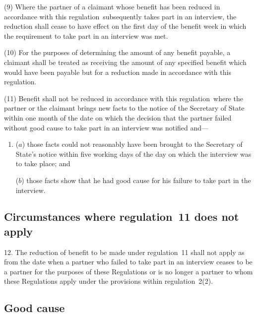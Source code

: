 \documentclass[12pt,a4paper]{article}
\begin{document}
(9) Where the partner of a claimant whose benefit has been reduced in accordance with this regulation~subsequently takes part in an interview, the reduction shall cease to have effect on the first day of the benefit week in which the requirement to take part in an interview was met.

(10) For the purposes of determining the amount of any benefit payable, a claimant shall be treated as receiving the amount of any specified benefit which would have been payable but for a reduction made in accordance with this regulation.

(11) Benefit shall not be reduced in accordance with this regulation~where the partner or the claimant brings new facts to the notice of the Secretary of State within one month of the date on which the decision that the partner failed without good cause to take part in an interview was notified and—
\begin{enumerate}\item[]
($a$) those facts could not reasonably have been brought to the Secretary of State’s notice within five working days of the day on which the interview was to take place; and

($b$) those facts show that he had good cause for his failure to take part in the interview.
\end{enumerate}

\subsection[12. Circumstances where regulation~11 does not apply]{Circumstances where regulation~11 does not apply}

12.  The reduction of benefit to be made under regulation~11 shall not apply as from the date when a partner who failed to take part in an interview ceases to be a partner for the purposes of these Regulations or is no longer a partner to whom these Regulations apply under the provisions within regulation~2(2).

\subsection[13. Good cause]{Good cause}
\end{document}

